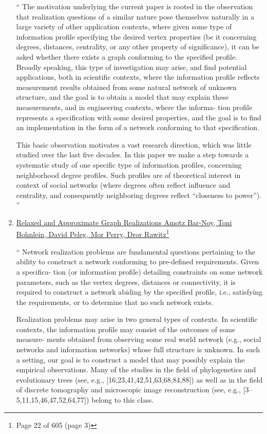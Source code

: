 \documentclass[11pt,a4paper]{article}
\theoremstyle{definition}
\begin{document}
\begin{enumerate}
``
The motivation underlying the current paper is
rooted in the observation that realization questions of a similar nature pose themselves naturally in a large
variety of other application contexts, where given some type of information profile specifying the desired
vertex properties (be it concerning degrees, distances, centrality, or any other property of significance), it
can be asked whether there exists a graph conforming to the specified profile. Broadly speaking, this type
of investigation may arise, and find potential applications, both in scientific contexts, where the information
profile reflects measurement results obtained from some natural network of unknown structure, and the goal
is to obtain a model that may explain these measurements, and in engineering contexts, where the informa-
tion profile represents a specification with some desired properties, and the goal is to find an implementation
in the form of a network conforming to that specification.

This basic observation motivates a vast research direction, which was little studied over the last five
decades. In this paper we make a step towards a systematic study of one specific type of information
profiles, concerning neighborhood degree profiles. Such profiles are of theoretical interest in context of
social networks (where degrees often reflect influence and centrality, and consequently neighboring degrees
reflect “closeness to power”).
''

\item 
\hyperlink{https://sci-hub.ru/https://link.springer.com/chapter/10.1007/978-3-030-79987-8_5}
{Relaxed and Approximate Graph Realizations Amotz Bar-Noy, Toni Bohnlein, David Peleg, Mor Perry, Dror Rawitz}\footnote{Page 22 of 605 (page 3)}

``
Network realization problems are fundamental questions pertaining to the ability
to construct a network conforming to pre-defined requirements. Given a specifica-
tion (or information profile) detailing constraints on some network parameters,
such as the vertex degrees, distances or connectivity, it is required to construct
a network abiding by the specified profile, i.e., satisfying the requirements, or to
determine that no such network exists.

Realization problems may arise in two general types of contexts. In scientific
contexts, the information profile may consist of the outcomes of some measure-
ments obtained from observing some real world network (e.g., social networks
and information networks) whose full structure is unknown. In such a setting, our
goal is to construct a model that may possibly explain the empirical observations.
Many of the studies in the field of phylogenetics and evolutionary trees (see, e.g.,
[16,23,41,42,51,63,68,84,88]) as well as in the field of discrete tomography and
microscopic image reconstruction (see, e.g., [3–5,11,15,46,47,52,64,77]) belong
to this class.


\end{enumerate}
\end{document}
